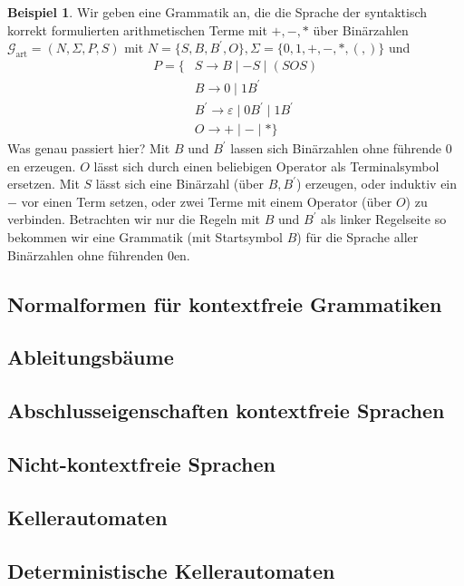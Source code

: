 \documentclass[11pt, a4paper]{article}
\theoremstyle{definition}
\newtheorem{example}[definition]{Beispiel}
\theoremstyle{plain}
\numberwithin{equation}{section}
\begin{document}
\begin{example}
	Wir geben eine Grammatik an, die die Sprache der syntaktisch korrekt formulierten arithmetischen Terme mit $+, -, \ast$ über Binärzahlen $\mathcal{G}_\text{art} = (N, \Sigma, P, S)$ mit $N = \{S, B, B^\prime, O\}, \Sigma = \{0, 1, +, - ,\ast, (, )\}$ und
	\begin{align*}
		P = \{ & S \to B \mid -S \mid (SOS)\\
		& B \to 0 \mid 1B^\prime\\
		& B^\prime \to \varepsilon \mid 0B^\prime \mid 1B^\prime\\
		& O \to + \mid - \mid \ast \}
	\end{align*}
	Was genau passiert hier? Mit $B$ und $B^\prime$ lassen sich Binärzahlen ohne führende $0$en erzeugen. $O$ lässt sich durch einen beliebigen Operator als Terminalsymbol ersetzen. Mit $S$ lässt sich eine Binärzahl (über $B, B^\prime$) erzeugen, oder induktiv ein $-$ vor einen Term setzen, oder zwei Terme mit einem Operator (über $O$) zu verbinden. Betrachten wir nur die Regeln mit $B$ und $B^\prime$ als linker Regelseite so bekommen wir eine Grammatik (mit Startsymbol $B$) für die Sprache aller Binärzahlen ohne führenden $0$en.
\end{example}


\subsection{Normalformen für kontextfreie Grammatiken}


\subsection{Ableitungsbäume}


\subsection{Abschlusseigenschaften kontextfreie Sprachen}


\subsection{Nicht-kontextfreie Sprachen}


\subsection{Kellerautomaten}


\subsection{Deterministische Kellerautomaten}
\end{document}
